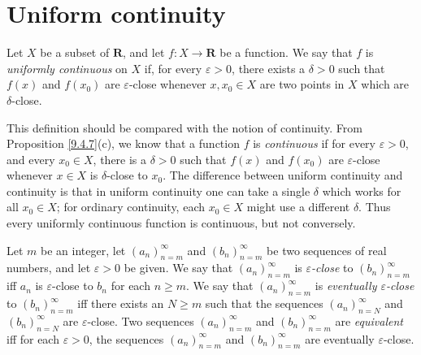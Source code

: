 \section{Uniform continuity}\label{sec 9.9}

\setcounter{theorem}{1}
\begin{definition}\label{9.9.2}
    Let \(X\) be a subset of \(\mathbf{R}\), and let \(f : X \to \mathbf{R}\) be a function.
    We say that \(f\) is \emph{uniformly continuous} on \(X\) if, for every \(\varepsilon > 0\), there exists a \(\delta > 0\) such that \(f(x)\) and \(f(x_0)\) are \(\varepsilon\)-close whenever \(x, x_0 \in X\) are two points in \(X\) which are \(\delta\)-close.
\end{definition}

\begin{remark}\label{9.9.3}
    This definition should be compared with the notion of continuity.
    From Proposition \ref{9.4.7}(c), we know that a function \(f\) is \emph{continuous} if for every \(\varepsilon > 0\), and every \(x_0 \in X\), there is a \(\delta > 0\) such that \(f(x)\) and \(f(x_0)\) are \(\varepsilon\)-close whenever \(x \in X\) is \(\delta\)-close to \(x_0\).
    The difference between uniform continuity and continuity is that in uniform continuity one can take a single \(\delta\) which works for all \(x_0 \in X\);
    for ordinary continuity, each \(x_0 \in X\) might use a different \(\delta\).
    Thus every uniformly continuous function is continuous, but not conversely.
\end{remark}

\setcounter{theorem}{4}
\begin{definition}\label{9.9.5}
    Let \(m\) be an integer, let \((a_n)_{n = m}^\infty\) and \((b_n)_{n = m}^\infty\) be two sequences of real numbers, and let \(\varepsilon > 0\) be given.
    We say that \((a_n)_{n = m}^\infty\) is \emph{\(\varepsilon\)-close} to \((b_n)_{n = m}^\infty\) iff \(a_n\) is \(\varepsilon\)-close to \(b_n\) for each \(n \geq m\).
    We say that \((a_n)_{n = m}^\infty\) is \emph{eventually \(\varepsilon\)-close} to \((b_n)_{n = m}^\infty\) iff there exists an \(N \geq m\) such that the sequences \((a_n)_{n = N}^\infty\) and \((b_n)_{n = N}^\infty\) are \(\varepsilon\)-close.
    Two sequences \((a_n)_{n = m}^\infty\) and \((b_n)_{n = m}^\infty\) are \emph{equivalent} iff for each \(\varepsilon > 0\), the sequences \((a_n)_{n = m}^\infty\) and \((b_n)_{n = m}^\infty\) are eventually \(\varepsilon\)-close.
\end{definition}

